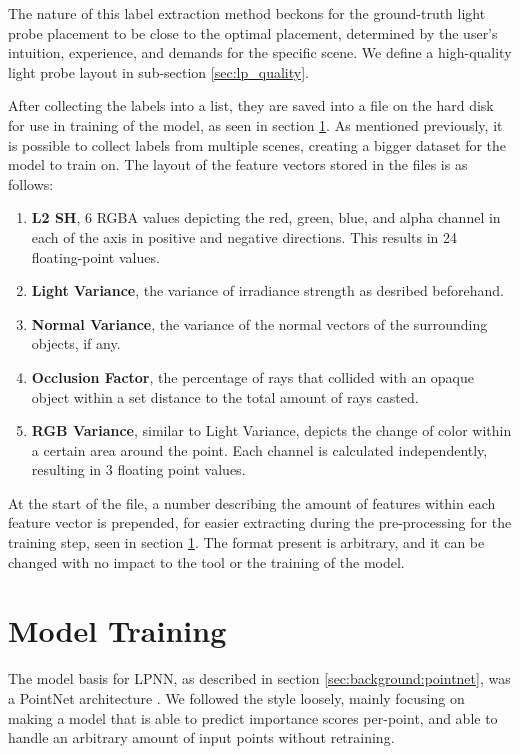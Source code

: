 The nature of this label extraction method beckons for the ground-truth light probe placement to be close to the optimal placement, determined by the user's intuition, experience, and demands for the specific scene. We define a high-quality light probe layout in sub-section \ref{sec:lp_quality}.

After collecting the labels into a list, they are saved into a file on the hard disk for use in training of the model, as seen in section \ref{sec:model_training}. As mentioned previously, it is possible to collect labels from multiple scenes, creating a bigger dataset for the model to train on. The layout of the feature vectors stored in the files is as follows:

\begin{enumerate}
	\item \textbf{L2 SH}, 6 RGBA values depicting the red, green, blue, and alpha channel in each of the axis in positive and negative directions. This results in 24 floating-point values.
	\item \textbf{Light Variance}, the variance of irradiance strength as desribed beforehand.
	\item \textbf{Normal Variance}, the variance of the normal vectors of the surrounding objects, if any.
	\item \textbf{Occlusion Factor}, the percentage of rays that collided with an opaque object within a set distance to the total amount of rays casted.
	\item \textbf{RGB Variance}, similar to Light Variance, depicts the change of color within a certain area around the point. Each channel is calculated independently, resulting in 3 floating point values.
\end{enumerate}

At the start of the file, a number describing the amount of features within each feature vector is prepended, for easier extracting during the pre-processing for the training step, seen in section \ref{sec:model_training}. The format present is arbitrary, and it can be changed with no impact to the tool or the training of the model.

\section{Model Training}
\label{sec:model_training}

The model basis for LPNN, as described in section \ref{sec:background:pointnet}, was a PointNet architecture \parencite{PointNet2017}. We followed the style loosely, mainly focusing on making a model that is able to predict importance scores per-point, and able to handle an arbitrary amount of input points without retraining. 

